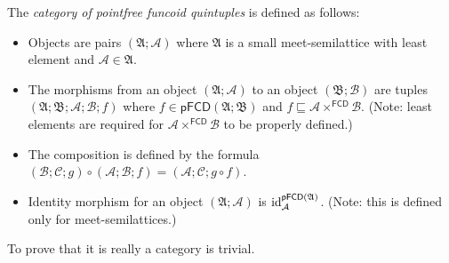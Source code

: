 The \emph{category of
pointfree funcoid quintuples} is defined as follows:
\begin{itemize}
\item Objects are pairs $(\mathfrak{A};\mathcal{A})$ where $\mathfrak{A}$
is a small meet-semilattice with least element and $\mathcal{A}\in\mathfrak{A}$.
\item The morphisms from an object $(\mathfrak{A};\mathcal{A})$ to an object
$(\mathfrak{B};\mathcal{B})$ are tuples $(\mathfrak{A};\mathfrak{B};\mathcal{A};\mathcal{B};f)$
where $f\in\mathsf{pFCD}(\mathfrak{A};\mathfrak{B})$ and $f\sqsubseteq\mathcal{A}\times^{\mathsf{FCD}}\mathcal{B}$.
(Note: least elements are required for $\mathcal{A}\times^{\mathsf{FCD}}\mathcal{B}$
to be properly defined.)
\item The composition is defined by the formula $(\mathcal{B};\mathcal{C};g)\circ(\mathcal{A};\mathcal{B};f)=(\mathcal{A};\mathcal{C};g\circ f)$.
\item Identity morphism for an object $(\mathfrak{A};\mathcal{A})$ is $\operatorname{id}_{\mathcal{A}}^{\mathsf{pFCD}(\mathfrak{A})}$.
(Note: this is defined only for meet-semilattices.)
\end{itemize}
To prove that it is really a category is trivial.


